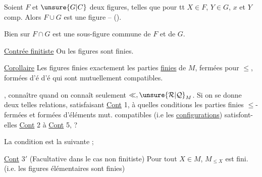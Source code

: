   Soient $F$ et $\unsure{G|C}$ deux figures, telles que pour tt \deleted{$\forall$}$X\in F$, $Y\in G$, $x$ et $Y$ comp.
Alors $F\cup G$ est une figure --  ().

Bien sur $F\cap G$ est une sous-figure commune de $F$ et de $G$.


\uline{Contrée finitiste} Ou les figures sont finies.  

\uline{Corollaire}  Les figures finies  exactement les parties \uline{finies} de $M$, fermées pour $\leq$, formées d'é  d'é  qui sont mutuellement compatibles.

,      connaître quand on connaît seulement $\ll,\unsure{\mathcal R|\mathcal Q}_{M}$. 
Si on se donne deux telles relations,  satisfaisant \uline{Cont} 1, à quelles conditions les parties finies $\leq$-fermées  et formées d'éléments mut. compatibles (i.e les \uline{configurations}) satisfont-elles \uline{Cont} 2 à \uline{Cont} 5, ?

 La condition est la suivante ; 

\uline{Cont} $3'$ (Facultative dans le cas non finitiste) \deleted{$\forall$} Pour tout $X\in M$,   $M_{\leq X}$ est fini. (i.e. les figures élémentaires sont finies)

